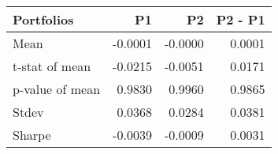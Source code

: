 \begin{tabular}{lrrr}
\toprule
Portfolios & P1 & P2 & P2 - P1 \\
\midrule
Mean & -0.0001 & -0.0000 & 0.0001 \\
t-stat of mean & -0.0215 & -0.0051 & 0.0171 \\
p-value of mean & 0.9830 & 0.9960 & 0.9865 \\
Stdev & 0.0368 & 0.0284 & 0.0381 \\
Sharpe & -0.0039 & -0.0009 & 0.0031 \\
\bottomrule
\end{tabular}
